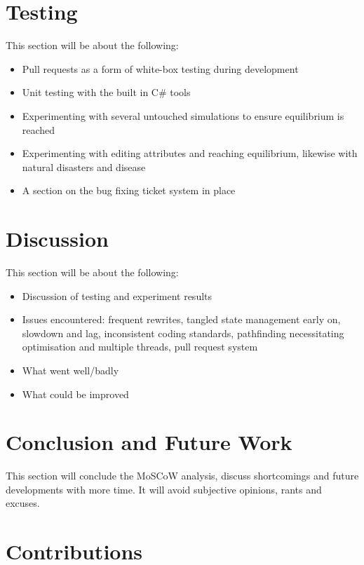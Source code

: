 \documentclass[a4paper, oneside, 11pt]{report}
\begin{document}
\chapter{Testing}\label{testing}

This section will be about the following:
\begin{itemize}
	\itemsep0em
	\item Pull requests as a form of white-box testing during development
	\item Unit testing with the built in C\# tools
	\item Experimenting with several untouched simulations to ensure equilibrium is reached 
	\item Experimenting with editing attributes and reaching equilibrium, likewise with natural disasters and disease
	\item A section on the bug fixing ticket system in place \label{bugfixing}
\end{itemize} 

\chapter{Discussion}\label{discussion}

This section will be about the following:
\begin{itemize}
	\itemsep0em
	\item Discussion of testing and experiment results
	\item Issues encountered: frequent rewrites, tangled state management early on, slowdown and lag, inconsistent coding standards, pathfinding necessitating optimisation and multiple threads, pull request system 
	\item What went well/badly
	\item What could be improved
\end{itemize} 

\chapter{Conclusion and Future Work}\label{conclusion}

This section will conclude the MoSCoW analysis, discuss shortcomings and future developments with more time. It will avoid subjective opinions, rants and excuses.




\chapter*{Contributions}
\end{document}
